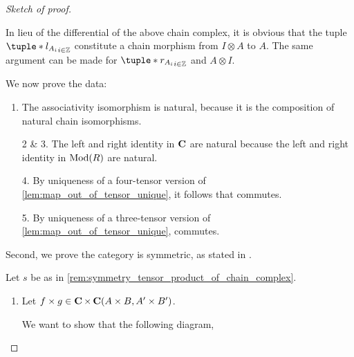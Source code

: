 \begin{proof}[Sketch of proof]
\begin{enumerate}
{            In lieu of the differential of the above chain complex, it is obvious that the tuple \( \tuple*{l_{A_i}}_{i \in \Zb} \) constitute a chain morphism from \( I \otimes A \) to \( A \). The same argument can be made for \( \tuple*{r_{A_i}}_{i \in \Zb} \) and \( A \otimes I \).
        }
    \end{enumerate}
    We now prove the data:
    \begin{enumerate}
        \item {
            The associativity isomorphism is natural, because it is the composition of natural chain isomorphisms. 
        }
        \item[2 \& 3.] {
            The left and right identity in \( \operatorname{\mathbf{C}} \) are natural because the left and right identity in \( \operatorname{Mod}(R) \) are natural.
        }
        \item[4.] {
            By uniqueness of a four-tensor version of \autoref{lem:map_out_of_tensor_unique}, it follows that \cite[Diagram 6.1]{Borceux_1994} commutes.
        }
        \item[5.] {
            By uniqueness of a three-tensor version of \autoref{lem:map_out_of_tensor_unique}, \cite[Diagram 6.2]{Borceux_1994} commutes.
        }
    \end{enumerate}

    Second, we prove the category is symmetric, as stated in \cite[Definition 6.1.2]{Borceux_1994}.

    Let \( s \) be as in \autoref{rem:symmetry_tensor_product_of_chain_complex}.

    \begin{enumerate}
        \item {
            Let \( f \times g \in \operatorname{\mathbf{C}} \times \operatorname{\mathbf{C}} (A \times B, A' \times B') \).

            We want to show that the following diagram,
            \begin{center}
\end{center}}
\end{enumerate}
\end{proof}

